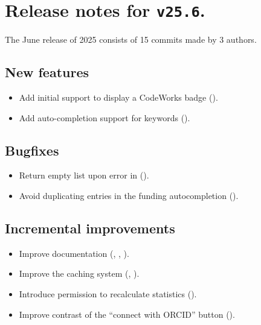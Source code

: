\section*{Release notes for \texttt{v25.6}.}

  The June release of 2025 consists of 15 commits made by 3 authors.

\subsection*{New features}
\begin{itemize}
\item{Add initial support to display a CodeWorks badge
    ().}
\item{Add auto-completion support for keywords
    ().}
\end{itemize}

\subsection*{Bugfixes}
\begin{itemize}
\item{Return empty list upon error in 
    ().}
\item{Avoid duplicating entries in the funding autocompletion
    ().}
\end{itemize}

\subsection*{Incremental improvements}
\begin{itemize}
\item{Improve documentation (,
    ,
    ).}
\item{Improve the caching system (,
    ).}
\item{Introduce permission to recalculate statistics
    ().}
\item{Improve contrast of the ``connect with ORCID'' button
    ().}
\end{itemize}

